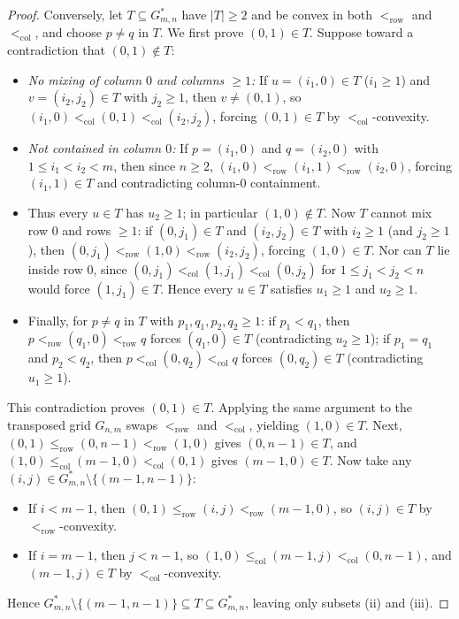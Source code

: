 \documentclass[11pt]{article}
\theoremstyle{plain}
\theoremstyle{definition}
\begin{document}
\begin{proof}
Conversely, let $T \subseteq G_{m,n}^*$ have $|T| \ge 2$ and be convex in both $<_{\mathrm{row}}$ and $<_{\mathrm{col}}$, and choose $p \ne q$ in $T$. We first prove $(0, 1) \in T$. Suppose toward a contradiction that $(0, 1) \notin T$:
\begin{itemize}\setlength{\itemsep}{2pt}
  \item \emph{No mixing of column $0$ and columns $\ge 1$:} If $u = (i_1, 0) \in T$ ($i_1 \ge 1$) and $v = (i_2, j_2) \in T$ with $j_2 \ge 1$, then $v \ne (0, 1)$, so $(i_1, 0) <_{\mathrm{col}} (0, 1) <_{\mathrm{col}} (i_2, j_2)$, forcing $(0, 1) \in T$ by $<_{\mathrm{col}}$-convexity.
  \item \emph{Not contained in column $0$:} If $p = (i_1, 0)$ and $q = (i_2, 0)$ with $1 \le i_1 < i_2 < m$, then since $n \ge 2$, $(i_1, 0) <_{\mathrm{row}} (i_1, 1) <_{\mathrm{row}} (i_2, 0)$, forcing $(i_1, 1) \in T$ and contradicting column-$0$ containment.
  \item Thus every $u \in T$ has $u_2 \ge 1$; in particular $(1, 0) \notin T$. Now $T$ cannot mix row $0$ and rows $\ge 1$: if $(0, j_1) \in T$ and $(i_2, j_2) \in T$ with $i_2 \ge 1$ (and $j_2 \ge 1$), then $(0, j_1) <_{\mathrm{row}} (1, 0) <_{\mathrm{row}} (i_2, j_2)$, forcing $(1, 0) \in T$. Nor can $T$ lie inside row $0$, since $(0, j_1) <_{\mathrm{col}} (1, j_1) <_{\mathrm{col}} (0, j_2)$ for $1 \le j_1 < j_2 < n$ would force $(1, j_1) \in T$. Hence every $u \in T$ satisfies $u_1 \ge 1$ and $u_2 \ge 1$.
  \item Finally, for $p \ne q$ in $T$ with $p_1, q_1, p_2, q_2 \ge 1$: if $p_1 < q_1$, then $p <_{\mathrm{row}} (q_1, 0) <_{\mathrm{row}} q$ forces $(q_1, 0) \in T$ (contradicting $u_2 \ge 1$); if $p_1 = q_1$ and $p_2 < q_2$, then $p <_{\mathrm{col}} (0, q_2) <_{\mathrm{col}} q$ forces $(0, q_2) \in T$ (contradicting $u_1 \ge 1$).
\end{itemize}
This contradiction proves $(0, 1) \in T$. Applying the same argument to the transposed grid $G_{n,m}$ swaps $<_{\mathrm{row}}$ and $<_{\mathrm{col}}$, yielding $(1, 0) \in T$. Next, $(0, 1) \le_{\mathrm{row}} (0, n-1) <_{\mathrm{row}} (1, 0)$ gives $(0, n-1) \in T$, and $(1, 0) \le_{\mathrm{col}} (m-1, 0) <_{\mathrm{col}} (0, 1)$ gives $(m-1, 0) \in T$. Now take any $(i, j) \in G_{m,n}^* \setminus \{(m-1, n-1)\}$:
\begin{itemize}\setlength{\itemsep}{2pt}
  \item If $i < m - 1$, then $(0, 1) \le_{\mathrm{row}} (i, j) <_{\mathrm{row}} (m-1, 0)$, so $(i, j) \in T$ by $<_{\mathrm{row}}$-convexity.
  \item If $i = m - 1$, then $j < n - 1$, so $(1, 0) \le_{\mathrm{col}} (m-1, j) <_{\mathrm{col}} (0, n-1)$, and $(m-1, j) \in T$ by $<_{\mathrm{col}}$-convexity.
\end{itemize}
Hence $G_{m,n}^* \setminus \{(m-1, n-1)\} \subseteq T \subseteq G_{m,n}^*$, leaving only subsets (ii) and (iii).
\end{proof}
\end{document}
